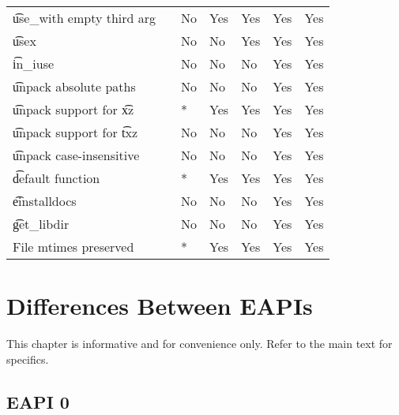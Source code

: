 \begin{landscape}
\begin{longtable}{llP{7.5em}P{7.5em}P{7.5em}P{7.5em}P{7.5em}}
\t{use_with} empty third arg &  &
    No & Yes & Yes & Yes & Yes \\

\t{usex} &  &
    No & No & Yes & Yes & Yes \\

\t{in_iuse} &  &
    No & No & No & Yes & Yes \\

\t{unpack} absolute paths &  &
    No & No & No & Yes & Yes \\

\t{unpack} support for \t{xz} &  &
    * & Yes & Yes & Yes & Yes \\

\t{unpack} support for \t{txz} &  &
    No & No & No & Yes & Yes \\

\t{unpack} case-insensitive &  &
    No & No & No & Yes & Yes \\

\t{default} function &  &
    * & Yes & Yes & Yes & Yes \\

\t{einstalldocs} &  &
    No & No & No & Yes & Yes \\

\t{get_libdir} &  &
    No & No & No & Yes & Yes \\

File mtimes preserved &  &
    * & Yes & Yes & Yes & Yes \\

\end{longtable}
\end{landscape}

\chapter{Differences Between EAPIs}

\note This chapter is informative and for convenience only. Refer to the main text for specifics.

\section{EAPI 0}

